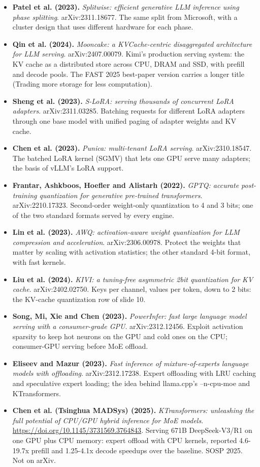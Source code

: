 \documentclass[11pt,letterpaper]{article}
\begin{document}
\begin{itemize}[leftmargin=1.2em,itemsep=3pt]
\item \textbf{Patel et al. (2023).} \textit{Splitwise: efficient generative LLM inference using phase splitting}. arXiv:2311.18677. The same split from Microsoft, with a cluster design that uses different hardware for each phase.
\item \textbf{Qin et al. (2024).} \textit{Mooncake: a KVCache-centric disaggregated architecture for LLM serving}. arXiv:2407.00079. Kimi's production serving system: the KV cache as a distributed store across CPU, DRAM and SSD, with prefill and decode pools. The FAST 2025 best-paper version carries a longer title (Trading more storage for less computation).
\item \textbf{Sheng et al. (2023).} \textit{S-LoRA: serving thousands of concurrent LoRA adapters}. arXiv:2311.03285. Batching requests for different LoRA adapters through one base model with unified paging of adapter weights and KV cache.
\item \textbf{Chen et al. (2023).} \textit{Punica: multi-tenant LoRA serving}. arXiv:2310.18547. The batched LoRA kernel (SGMV) that lets one GPU serve many adapters; the basis of vLLM's LoRA support.
\item \textbf{Frantar, Ashkboos, Hoefler and Alistarh (2022).} \textit{GPTQ: accurate post-training quantization for generative pre-trained transformers}. arXiv:2210.17323. Second-order weight-only quantization to 4 and 3 bits; one of the two standard formats served by every engine.
\item \textbf{Lin et al. (2023).} \textit{AWQ: activation-aware weight quantization for LLM compression and acceleration}. arXiv:2306.00978. Protect the weights that matter by scaling with activation statistics; the other standard 4-bit format, with fast kernels.
\item \textbf{Liu et al. (2024).} \textit{KIVI: a tuning-free asymmetric 2bit quantization for KV cache}. arXiv:2402.02750. Keys per channel, values per token, down to 2 bits: the KV-cache quantization row of slide 10.
\item \textbf{Song, Mi, Xie and Chen (2023).} \textit{PowerInfer: fast large language model serving with a consumer-grade GPU}. arXiv:2312.12456. Exploit activation sparsity to keep hot neurons on the GPU and cold ones on the CPU; consumer-GPU serving before MoE offload.
\item \textbf{Eliseev and Mazur (2023).} \textit{Fast inference of mixture-of-experts language models with offloading}. arXiv:2312.17238. Expert offloading with LRU caching and speculative expert loading; the idea behind llama.cpp's --n-cpu-moe and KTransformers.
\item \textbf{Chen et al. (Tsinghua MADSys) (2025).} \textit{KTransformers: unleashing the full potential of CPU/GPU hybrid inference for MoE models}. \url{https://doi.org/10.1145/3731569.3764843}. Serving 671B DeepSeek-V3/R1 on one GPU plus CPU memory: expert offload with CPU kernels, reported 4.6-19.7x prefill and 1.25-4.1x decode speedups over the baseline. SOSP 2025. Not on arXiv.
\end{itemize}
\end{document}
